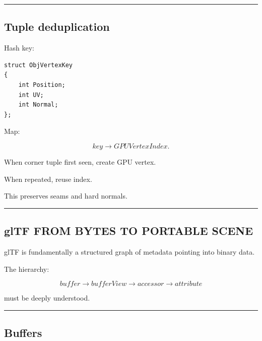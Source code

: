 \begin{center}\rule{0.5\linewidth}{0.5pt}\end{center}

\subsection{Tuple deduplication}\label{04-visual-computing-ii-ch041-tuple-deduplication}

\hypertarget{04-visual-computing-ii-ch041-tuple-deduplication}{}

Hash key:

\begin{verbatim}
struct ObjVertexKey
{
    int Position;
    int UV;
    int Normal;
};
\end{verbatim}

Map:

\[
key\rightarrow GPUVertexIndex.
\]

When corner tuple first seen, create GPU vertex.

When repeated, reuse index.

This preserves seams and hard normals.

\begin{center}\rule{0.5\linewidth}{0.5pt}\end{center}

\subsection{glTF FROM BYTES TO PORTABLE SCENE}\label{04-visual-computing-ii-ch041-gltf-from-bytes-to-portable-scene}

\hypertarget{04-visual-computing-ii-ch041-gltf-from-bytes-to-portable-scene}{}

glTF is fundamentally a structured graph of metadata pointing into binary data.

The hierarchy:

\[
\boxed{
buffer
\rightarrow
bufferView
\rightarrow
accessor
\rightarrow
attribute
}
\]

must be deeply understood.

\begin{center}\rule{0.5\linewidth}{0.5pt}\end{center}

\subsection{Buffers}\label{04-visual-computing-ii-ch041-buffers}


